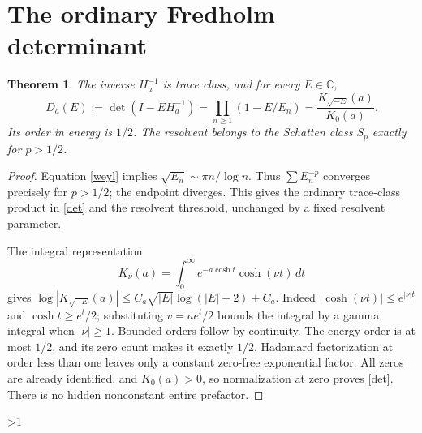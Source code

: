 \documentclass[10pt]{article}
\newtheorem{theorem}{Theorem}
\begin{document}
\section{The ordinary Fredholm determinant}
\begin{theorem}
The inverse $H_a^{-1}$ is trace class, and for every $E\in\mathbb C$,
\begin{equation}\label{det}
 D_a(E):=\det(I-EH_a^{-1})
 =\prod_{n\ge1}(1-E/E_n)
 =\frac{K_{\sqrt{-E}}(a)}{K_0(a)}.
\end{equation}
Its order in energy is $1/2$. The resolvent belongs to the Schatten
class $S_p$ exactly for $p>1/2$.
\end{theorem}
\begin{proof}
Equation \eqref{weyl} implies $\sqrt{E_n}\sim\pi n/\log n$.
Thus $\sum E_n^{-p}$ converges precisely for $p>1/2$; the endpoint
diverges. This gives the ordinary trace-class product in \eqref{det}
and the resolvent threshold, unchanged by a fixed resolvent parameter.

The integral representation
\[
 K_\nu(a)=\int_0^\infty e^{-a\cosh t}\cosh(\nu t)\,dt
\]
gives $\log|K_{\sqrt{-E}}(a)|\le
C_a\sqrt{|E|}\log(|E|+2)+C_a$.
Indeed $|\cosh(\nu t)|\le e^{|\nu|t}$ and
$\cosh t\ge e^t/2$; substituting $v=ae^t/2$ bounds the integral
by a gamma integral when $|\nu|\ge1$. Bounded orders follow by continuity.
The energy order is at most $1/2$, and its zero count makes it exactly
$1/2$. Hadamard factorization at order less than one leaves only a
constant zero-free exponential factor. All zeros are already identified,
and $K_0(a)>0$, so normalization at zero proves \eqref{det}.
There is no hidden nonconstant entire prefactor.
\end{proof}
\fi

\ifnum\CRevisionRound>1
\end{document}
